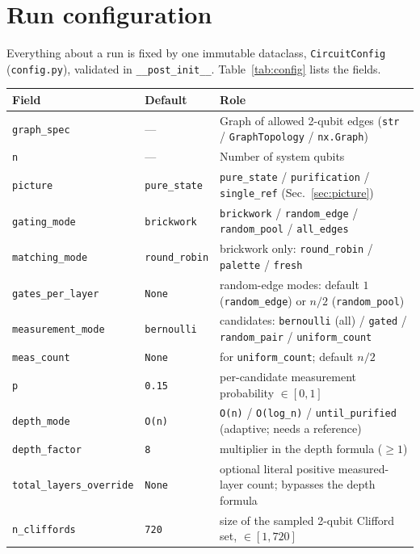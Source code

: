 \documentclass[11pt]{article}
\newcommand{\code}[1]{\texttt{#1}}
\newcommand{\file}[1]{\texttt{#1}}
\begin{document}
\section{Run configuration}
\label{sec:config}
Everything about a run is fixed by one immutable dataclass, \code{CircuitConfig} (\file{config.py}), validated in
\code{\_\_post\_init\_\_}. Table~\ref{tab:config} lists the fields.

\begin{table}[h]\centering\small
\begin{tabular}{lll}
\toprule
Field & Default & Role\\
\midrule
\code{graph\_spec} & --- & Graph of allowed 2-qubit edges (\code{str} / \code{GraphTopology} / \code{nx.Graph})\\
\code{n} & --- & Number of system qubits\\
\code{picture} & \code{pure\_state} & \code{pure\_state} / \code{purification} / \code{single\_ref} (Sec.~\ref{sec:picture})\\
\code{gating\_mode} & \code{brickwork} & \code{brickwork} / \code{random\_edge} / \code{random\_pool} / \code{all\_edges}\\
\code{matching\_mode} & \code{round\_robin} & brickwork only: \code{round\_robin} / \code{palette} / \code{fresh}\\
\code{gates\_per\_layer} & \code{None} & random-edge modes: default $1$ (\code{random\_edge}) or $n/2$ (\code{random\_pool})\\
\code{measurement\_mode} & \code{bernoulli} & candidates: \code{bernoulli} (all) / \code{gated} / \code{random\_pair} / \code{uniform\_count}\\
\code{meas\_count} & \code{None} & for \code{uniform\_count}; default $n/2$\\
\code{p} & \code{0.15} & per-candidate measurement probability $\in[0,1]$\\
\code{depth\_mode} & \code{O(n)} & \code{O(n)} / \code{O(log\_n)} / \code{until\_purified} (adaptive; needs a reference)\\
\code{depth\_factor} & \code{8} & multiplier in the depth formula ($\ge1$)\\
\code{total\_layers\_override} & \code{None} & optional literal positive measured-layer count; bypasses the depth formula\\
\code{n\_cliffords} & \code{720} & size of the sampled 2-qubit Clifford set, $\in[1,720]$\\

\end{tabular}
\end{table}
\end{document}
